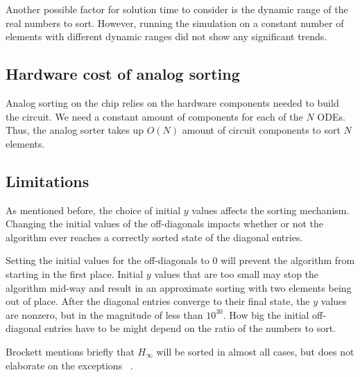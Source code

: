 Another possible factor for solution time to consider is the dynamic range of the real numbers to sort. However, running the simulation on a constant number of elements with different dynamic ranges did not show any significant trends.

\subsection{Hardware cost of analog sorting}

Analog sorting on the chip relies on the hardware components needed to build the circuit. 
We need a constant amount of components for each of the $N$ ODEs.
Thus, the analog sorter takes up $O(N)$ amount of circuit components to sort $N$ elements.


\subsection{Limitations}

As mentioned before, the choice of initial $y$ values affects the sorting mechanism. Changing the initial values of the off-diagonals impacts whether or not the algorithm ever reaches a correctly sorted state of the diagonal entries.

Setting the initial values for the off-diagonals to $0$ will prevent the algorithm from starting in the first place. Initial $y$ values that are too small may stop the algorithm mid-way and result in an approximate sorting with two elements being out of place. After the diagonal entries converge to their final state, the $y$ values are nonzero, but in the magnitude of less than $10^{30}$. How big the initial off-diagonal entries have to be might depend on the ratio of the numbers to sort.

Brockett mentions briefly that $H_\infty$ will be sorted in almost all cases, but does not elaborate on the exceptions ~\cite{brockett}.




